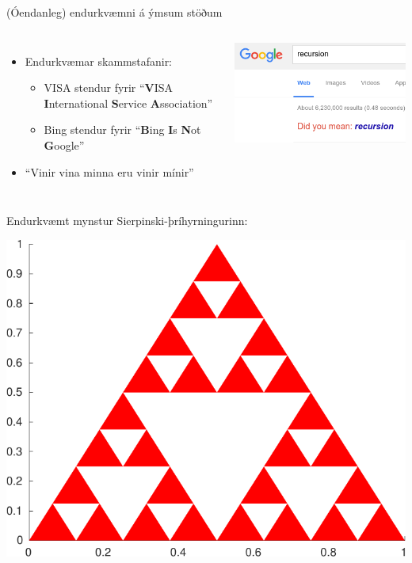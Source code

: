 \documentclass{beamer}
\begin{document}
\begin{frame}{(Óendanleg) endurkvæmni á ýmsum stöðum}
\begin{columns}
\begin{itemize}
 \item Endurkvæmar skammstafanir:
 \begin{itemize}
  \item VISA stendur fyrir ``\textbf{V}ISA \textbf{I}nternational \textbf{S}ervice \textbf{A}ssociation''
  \item Bing stendur fyrir ``\textbf{B}ing \textbf{I}s \textbf{N}ot \textbf{G}oogle''
 \end{itemize}
 \item ``Vinir vina minna eru vinir mínir''
\end{itemize}
\includegraphics[width=\linewidth]{Pics/google-recursion}
\end{columns}
\end{frame}

\begin{frame}{Endurkvæmt mynstur}
Sierpinski-þríhyrningurinn:
\begin{center}
\includegraphics[width=0.6\linewidth]{Pics/sierpinski}
\end{center}
\end{frame}
\end{document}
